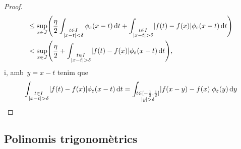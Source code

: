 \documentclass[../analisi-matematica.tex]{subfiles}
\begin{document}
\begin{proof}
\begin{multline*}
             \leq\sup_{x\in J}\left(\frac{\eta}{2}\int_{\substack{t\in I\\\abs{x-t}<\delta}}\phi_{\varepsilon}(x-t)\diff t+\int_{\substack{t\in I\\\abs{x-t}>\delta}}\abs{f(t)-f(x)}\phi_{\varepsilon}(x-t)\diff t\right) \hfill\\
             <\sup_{x\in J}\left(\frac{\eta}{2}+\int_{\substack{t\in I\\\abs{x-t}>\delta}}\abs{f(t)-f(x)}\phi_{\varepsilon}(x-t)\diff t\right), \hfill
         \end{multline*}
         i, amb~\(y=x-t\) tenim que %
         \[
             \int_{\substack{t\in I\\\abs{x-t}>\delta}}\abs{f(t)-f(x)}\phi_{\varepsilon}(x-t)\diff t=\int_{\substack{t\in[-\frac{1}{2},\frac{1}{2}]\\\abs{y}>\delta}}\abs{f(x-y)-f(x)}\phi_{\varepsilon}(y)\diff y
         \]
    \end{proof}
    \subsection{Polinomis trigonomètrics}
    \begin{definition}

    \end{definition}
\end{document}
